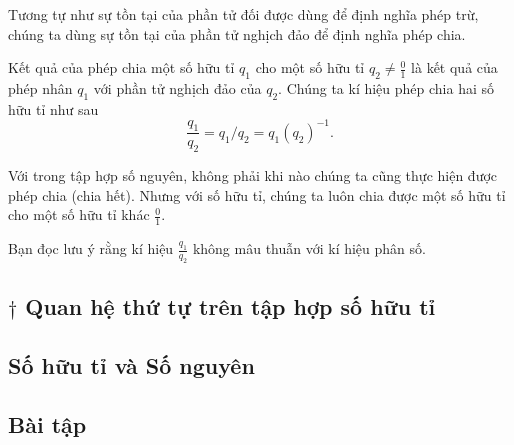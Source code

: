 Tương tự như sự tồn tại của phần tử đối được dùng để định nghĩa phép trừ, chúng ta dùng sự tồn tại của phần tử nghịch đảo để định nghĩa phép chia.
\begin{definition}
	Kết quả của phép chia một số hữu tỉ $q_{1}$ cho một số hữu tỉ $q_{2}\ne\frac{0}{1}$ là kết quả của phép nhân $q_{1}$ với phần tử nghịch đảo của $q_{2}$. Chúng ta kí hiệu phép chia hai số hữu tỉ như sau
	\[
		\frac{q_{1}}{q_{2}} = q_{1}/q_{2} = q_{1}{(q_{2})}^{-1}.
	\]
\end{definition}

Với trong tập hợp số nguyên, không phải khi nào chúng ta cũng thực hiện được phép chia (chia hết). Nhưng với số hữu tỉ, chúng ta luôn chia được một số hữu tỉ cho một số hữu tỉ khác $\frac{0}{1}$.

Bạn đọc lưu ý rằng kí hiệu $\frac{q_{1}}{q_{2}}$ không mâu thuẫn với kí hiệu phân số.

\subsection*{$\dagger$ Quan hệ thứ tự trên tập hợp số hữu tỉ}

\subsection*{Số hữu tỉ và Số nguyên}

\subsection*{Bài tập}
